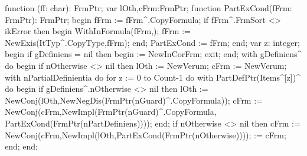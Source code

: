 \nwenddocs{}\endmoddef\nwstartdeflinemarkup{}\nwenddeflinemarkup
function (ff: char): FrmPtr;
var
   lOth,cFrm:FrmPtr;
   function PartExCond(fFrm: FrmPtr): FrmPtr;
   begin
      fFrm := fFrm^.CopyFormula;
      if fFrm^.FrmSort <> ikError then
      begin
         WithInFormula(fFrm,);
         fFrm := NewExis(ItTyp^.CopyType,fFrm);
      end;
      PartExCond := fFrm;
   end;
var
   z: integer;
begin
   if gDefiniens = nil then
   begin
       := NewInCorFrm; exit;
   end;
   with gDefiniens^ do
   begin
      if nOtherwise <> nil then lOth := NewVerum;
      cFrm := NewVerum;
      with nPartialDefinientia do
         for z := 0 to Count-1 do
            with PartDefPtr(Items^[z])^ do
         begin
            if gDefiniens^.nOtherwise <> nil then
               lOth := NewConj(lOth,NewNegDis(FrmPtr(nGuard)^.CopyFormula));
            cFrm := NewConj(cFrm,NewImpl(FrmPtr(nGuard)^.CopyFormula,
                                         PartExCond(FrmPtr(nPartDefiniens))));
         end;
      if nOtherwise <> nil then
         cFrm := NewConj(cFrm,NewImpl(lOth,PartExCond(FrmPtr(nOtherwise))));
       := cFrm;
   end;
end;
\eatline
{}\nwendcode{}\nwdocspar
\nwenddocs{}\endmoddef\nwstartdeflinemarkup{}\nwenddeflinemarkup

